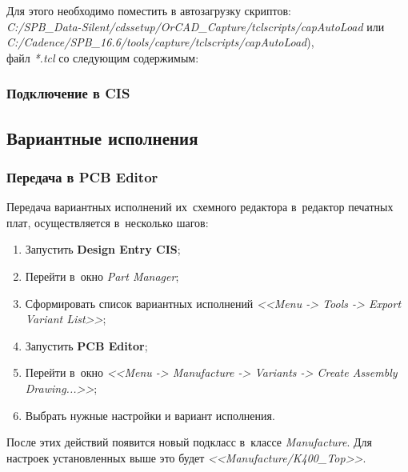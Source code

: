 Для этого необходимо поместить в автозагрузку скриптов: \\
\textit{C:/SPB\_Data-Silent/cdssetup/OrCAD\_Capture/tclscripts/capAutoLoad} или \\
\textit{C:/Cadence/SPB\_16.6/tools/capture/tclscripts/capAutoLoad}), \\
файл \textit{*.tcl} со следующим содержимым:



\subsubsection{Подключение в CIS} \label{sssec:bs_setup_cis}



\subsection{Вариантные исполнения} \label{ssec:variant_list}



\subsubsection{Передача в PCB Editor} \label{sssec:export_variant_list}

Передача вариантных исполнений их~схемного редактора в~редактор печатных плат, осуществляется в~несколько шагов:
\begin{enumerate}
	\item Запустить \textbf{Design Entry CIS};
	
	\item Перейти в~окно \textit{Part Manager};
	
	\item Сформировать список вариантных исполнений \textit{<<Menu -> Tools -> Export Variant List>>}; 
	
	\item Запустить \textbf{PCB Editor};
	
	\item Перейти в~окно \textit{<<Menu -> Manufacture -> Variants -> Create Assembly Drawing...>>};
	
	\item Выбрать нужные настройки и вариант исполнения.
	
		\begin{figure}[H]
		\end{figure}	
	
\end{enumerate}

После этих действий появится новый подкласс в~классе \textit{Manufacture}. Для настроек установленных выше это будет \textit{<<Manufacture/K400\_Top>>}.